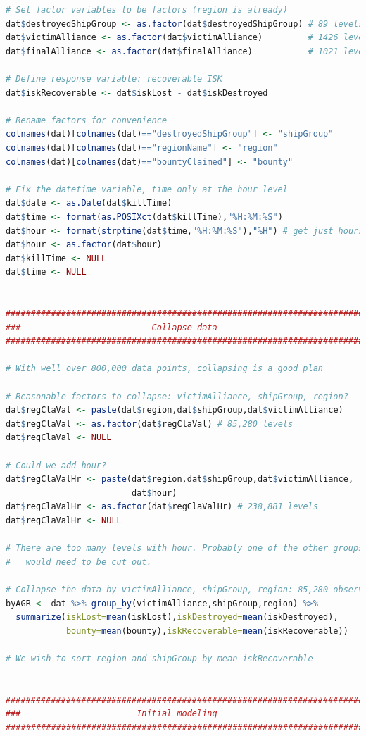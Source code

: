 \documentclass[letterpaper,12pt,article]{memoir}
\begin{document}
{\begin{lstlisting}[language=R]
# Set factor variables to be factors (region is already)
dat$destroyedShipGroup <- as.factor(dat$destroyedShipGroup) # 89 levels
dat$victimAlliance <- as.factor(dat$victimAlliance)         # 1426 levels
dat$finalAlliance <- as.factor(dat$finalAlliance)           # 1021 levels

# Define response variable: recoverable ISK
dat$iskRecoverable <- dat$iskLost - dat$iskDestroyed

# Rename factors for convenience
colnames(dat)[colnames(dat)=="destroyedShipGroup"] <- "shipGroup"
colnames(dat)[colnames(dat)=="regionName"] <- "region"
colnames(dat)[colnames(dat)=="bountyClaimed"] <- "bounty"

# Fix the datetime variable, time only at the hour level
dat$date <- as.Date(dat$killTime)
dat$time <- format(as.POSIXct(dat$killTime),"%H:%M:%S")
dat$hour <- format(strptime(dat$time,"%H:%M:%S"),"%H") # get just hours
dat$hour <- as.factor(dat$hour)
dat$killTime <- NULL
dat$time <- NULL


###############################################################################
###                          Collapse data                                  ###
###############################################################################

# With well over 800,000 data points, collapsing is a good plan

# Reasonable factors to collapse: victimAlliance, shipGroup, region?
dat$regClaVal <- paste(dat$region,dat$shipGroup,dat$victimAlliance)
dat$regClaVal <- as.factor(dat$regClaVal) # 85,280 levels
dat$regClaVal <- NULL

# Could we add hour?
dat$regClaValHr <- paste(dat$region,dat$shipGroup,dat$victimAlliance,
                         dat$hour)
dat$regClaValHr <- as.factor(dat$regClaValHr) # 238,881 levels
dat$regClaValHr <- NULL

# There are too many levels with hour. Probably one of the other groups
#   would need to be cut out.

# Collapse the data by victimAlliance, shipGroup, region: 85,280 observations
byAGR <- dat %>% group_by(victimAlliance,shipGroup,region) %>%
  summarize(iskLost=mean(iskLost),iskDestroyed=mean(iskDestroyed),
            bounty=mean(bounty),iskRecoverable=mean(iskRecoverable))

# We wish to sort region and shipGroup by mean iskRecoverable


###############################################################################
###                       Initial modeling                                  ###
###############################################################################


\end{lstlisting}}
\end{document}
